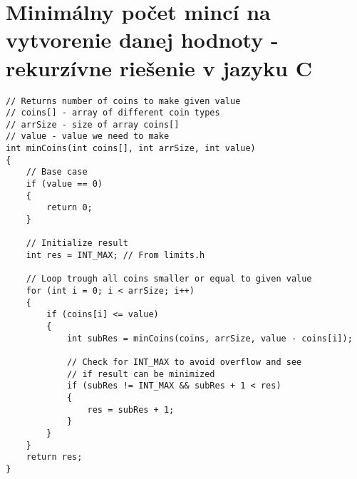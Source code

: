





\chapter{Minimálny počet mincí na vytvorenie danej hodnoty - rekurzívne riešenie v jazyku C}
\begin{lstlisting}
// Returns number of coins to make given value
// coins[] - array of different coin types
// arrSize - size of array coins[]
// value - value we need to make
int minCoins(int coins[], int arrSize, int value) 
{
    // Base case
    if (value == 0)
    {
        return 0;
    }

    // Initialize result
    int res = INT_MAX; // From limits.h

    // Loop trough all coins smaller or equal to given value
    for (int i = 0; i < arrSize; i++)
    {
        if (coins[i] <= value) 
        { 
            int subRes = minCoins(coins, arrSize, value - coins[i]);

            // Check for INT_MAX to avoid overflow and see 
            // if result can be minimized
            if (subRes != INT_MAX && subRes + 1 < res)
            {
                res = subRes + 1;
            }
        }
    }
    return res;
}
\end{lstlisting}

